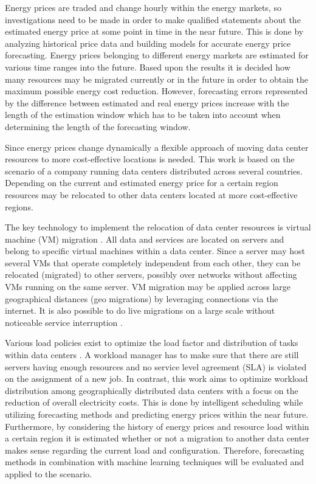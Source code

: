 Energy prices are traded and change hourly within the energy markets, so investigations need to be made in order to make qualified statements about the estimated energy price at some point in time in the near future.
This is done by analyzing historical price data and building models for accurate energy price forecasting. Energy prices belonging to different energy markets are estimated for various time ranges into the future. Based upon the results it is decided how many resources may be migrated currently or in the future in order to obtain the maximum possible energy cost reduction. 
However, forecasting errors represented by the difference between estimated and real energy prices increase with the length of the estimation window which has to be taken into account when determining the length of the forecasting window. 

Since energy prices change dynamically a flexible approach of moving data center resources to more cost-effective locations is needed. This work is based on the scenario of a company running data centers distributed across several countries. Depending on the current and estimated energy price for a certain region resources may be relocated to other data centers located at more cost-effective regions.

The key technology to implement the relocation of data center resources is virtual machine (VM) migration \cite{nelson2009virtual}. All data and services are located on servers and belong to specific virtual machines within a data center. Since a server may host several VMs that operate completely independent from each other, they can be relocated (migrated) to other servers, possibly over networks without affecting VMs running on the same server. VM migration may be applied across large geographical distances (geo migrations) by leveraging connections via the internet. It is also possible to do live migrations on a large scale without noticeable service interruption \cite{celesti2010improving}. 

Various load policies exist to optimize the load factor and distribution of tasks within data centers \cite{buyya2010energy}. A workload manager has to make sure that there are still servers having enough resources and no service level agreement (SLA) is violated on the assignment of a new job. 
In contrast, this work aims to optimize workload distribution among geographically distributed data centers with a focus on the reduction of overall electricity costs. This is done by intelligent scheduling while utilizing forecasting methods and predicting energy prices within the near future. 
Furthermore, by considering the history of energy prices and resource load within a certain region it is estimated whether or not a migration to another data center makes sense regarding the current load and configuration. Therefore, forecasting methods in combination with machine learning techniques will be evaluated and applied to the scenario. 

